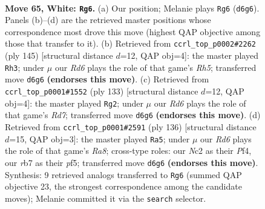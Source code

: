 \documentclass[11pt]{article}
\begin{document}
\clearpage

\begin{figure}[p]\centering
\begin{subfigure}{0.46\textwidth}\centering
\resizebox{\linewidth}{!}{%
\newchessgame
\chessboard[
  setfen={6k1/1r4b1/3R4/R7/2P5/8/2N4K/8 w - - 50 65},
  showmover=false,
  pgfstyle=straightmove, color=movearrow, markmove={d6-g6}
]}
\caption{}
\end{subfigure}\hfill
\begin{subfigure}{0.46\textwidth}\centering
\resizebox{\linewidth}{!}{%
\newchessgame
\chessboard[
  setfen={8/8/8/1n2k3/7r/3KB3/R7/8 b - - 0 73},
  showmover=false,
  pgfstyle=straightmove, color=movearrow, markmove={h4-h3}
]}
\caption{}
\end{subfigure}
\\[4pt]
\begin{subfigure}{0.46\textwidth}\centering
\resizebox{\linewidth}{!}{%
\newchessgame
\chessboard[
  setfen={8/5R2/8/4k1K1/6B1/1r6/3r4/8 b - - 5 67},
  showmover=false,
  pgfstyle=straightmove, color=movearrow, markmove={d2-g2}
]}
\caption{}
\end{subfigure}\hfill
\begin{subfigure}{0.46\textwidth}\centering
\resizebox{\linewidth}{!}{%
\newchessgame
\chessboard[
  setfen={R7/4bk2/7K/5p2/5P2/8/8/8 w - - 30 69},
  showmover=false,
  pgfstyle=straightmove, color=movearrow, markmove={a8-a5}
]}
\caption{}
\end{subfigure}
\caption{\textbf{Move 65, White: \texttt{Rg6}.} (a) Our position; Melanie plays \texttt{Rg6} (\texttt{d6g6}). Panels (b)--(d) are the retrieved master positions whose correspondence most drove this move (highest QAP objective among those that transfer to it). (b) Retrieved from \texttt{ccrl\_top\_p0002\#2262} (ply 145) [structural distance $d$=12, QAP obj=4]: the master played \texttt{Rh3}; under $\mu$ our \emph{Rd6} plays the role of that game's \emph{Rh5}; transferred move \texttt{d6g6} \textbf{(endorses this move)}. (c) Retrieved from \texttt{ccrl\_top\_p0001\#1552} (ply 133) [structural distance $d$=12, QAP obj=4]: the master played \texttt{Rg2}; under $\mu$ our \emph{Rd6} plays the role of that game's \emph{Rd7}; transferred move \texttt{d6g6} \textbf{(endorses this move)}. (d) Retrieved from \texttt{ccrl\_top\_p0001\#2591} (ply 136) [structural distance $d$=15, QAP obj=3]: the master played \texttt{Ra5}; under $\mu$ our \emph{Rd6} plays the role of that game's \emph{Ra8}; cross-type roles: our \emph{N}c2 as their \emph{P}f4, our \emph{r}b7 as their \emph{p}f5; transferred move \texttt{d6g6} \textbf{(endorses this move)}. Synthesis: 9 retrieved analogs transferred to \texttt{Rg6} (summed QAP objective 23, the strongest correspondence among the candidate moves); Melanie committed it via the \texttt{search} selector.}
\label{fig:thought-m128}
\end{figure}
\end{document}
